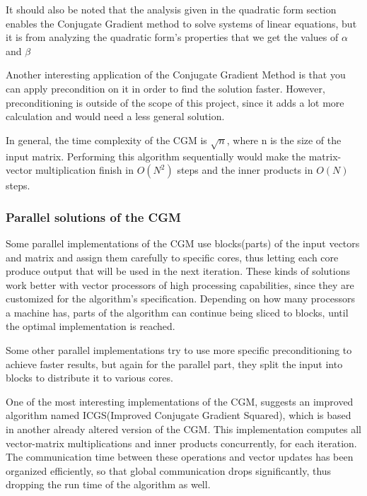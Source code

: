 \documentclass[12pt,a4paper]{article}
\begin{document}
It should also be noted that the analysis given in the quadratic form section enables the Conjugate Gradient method to solve systems of linear equations, but it is from analyzing the quadratic form's properties that we get the values of $\alpha$ and $\beta$\cite{press2007numerical}\cite{shewchuk1994introduction}\cite{cgm2009lec}

Another interesting application of the Conjugate Gradient Method is that you can apply precondition on it in order to find the solution faster. However, preconditioning is outside of the scope of this project, since it adds a lot more calculation and would need a less general solution.

In general, the time complexity of the CGM is $\sqrt{n}$, where n is the size of the input matrix. Performing this algorithm sequentially would make the matrix-vector multiplication finish in $O(N^2)$ steps and the inner products in $O(N)$ steps.
\subsubsection{Parallel solutions of the CGM}

Some parallel implementations of the CGM use blocks(parts) of the input vectors and matrix and assign them carefully to specific cores, thus letting each core produce output that will be used in the next iteration. These kinds of solutions work better with vector processors of high processing capabilities, since they are customized for the algorithm's specification. Depending on how many processors a machine has, parts of the algorithm can continue being sliced to blocks, until the optimal implementation is reached\cite{o1987parallel}.

Some other parallel implementations try to use more specific preconditioning to achieve faster results, but again for the parallel part, they split the input into blocks to distribute it to various cores\cite{adams1985m}\cite{adams1983m}. 

One of the most interesting implementations of the CGM, suggests an improved algorithm named ICGS(Improved Conjugate Gradient Squared), which is based in another already altered version of the CGM\cite{maheswaran1999mcgs}. This implementation computes all vector-matrix  multiplications and inner products concurrently, for each iteration. The communication time between these operations and vector updates has been organized efficiently, so that global communication drops significantly, thus dropping the run time of the algorithm as well\cite{yang2001improved}.
\end{document}
